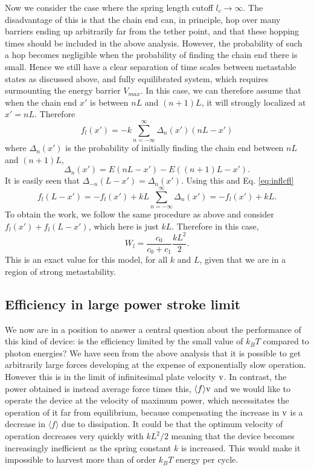 \documentclass[11pt]{ucthesis}
\begin{document}
Now we consider the case where the spring length cutoff $l_c \rightarrow \infty$. The
disadvantage of this is that the chain end can, in principle, hop over many
barriers ending up arbitrarily far from the tether point, and that these hopping
times should be included in the above analysis. However, the probability of such
a hop becomes negligible when the probability of finding the chain end there is small. Hence we
still have a clear separation of time scales between metastable states as
discussed above, and fully equilibrated system, which requires surmounting the
energy barrier $V_{max}$. In this case, we can therefore assume that when the
chain end $x'$ is between $nL$ and $(n+1)L$, it will strongly localized at $x' = nL$. 
Therefore 
\begin{equation}
\label{eq:inflcfl}
f_l(x') = -k \sum_{n=-\infty}^\infty \Delta_n(x') (nL-x')
\end{equation}
where $\Delta_n(x')$ is the probability of initially finding the chain end
between $nL$ and $(n+1)L$, 
\begin{equation}
\Delta_n(x') = E(nL-x')-E((n+1)L-x').
\end{equation}
It is easily seen that $\Delta_{-n}(L-x') = \Delta_n(x')$. Using this and Eq. \ref{eq:inflcfl}
\begin{equation}
f_l(L-x') = -f_l(x') +kL \sum_{n=-\infty}^\infty \Delta_n(x') =  -f_l(x') +kL  .
\end{equation}
To obtain the work, we follow the same procedure as above and consider $f_l(x') + f_l(L-x')$, which
here is just $kL$. Therefore in this case,
\begin{equation}
W_l = \frac{c_0}{c_0+c_1} \frac{k L^2}{2}.
\end{equation}
This is an exact value for this model, for all $k$ and $L$, given that we are in a region
of strong metastability.

\subsection{Efficiency in large power stroke limit}
\label{sec:EILPSL}
We now are in a position to answer a central question about the performance of
this kind of device: is the efficiency limited by the small value of $k_B T$
compared to photon energies? We have seen from the above analysis that it is
possible to get arbitrarily large forces developing at the expense of
exponentially slow operation. However this is in the limit of infinitesimal
plate velocity $\rm v$. In contrast, the power obtained is instead average
force times this, $\langle f\rangle {\rm v}$ and we would like to operate the
device at the velocity of maximum power, which necessitates the operation of it
far from equilibrium, because compensating the increase in $\rm v$ is a
decrease in $\langle f\rangle$ due to dissipation. It could be that the optimum velocity of operation
decreases very quickly with $k L^2/2$ meaning that the device becomes
increasingly inefficient as the spring constant $k$ is increased. This would
make it impossible to harvest more than of order $k_B T$ energy per cycle.
\end{document}
